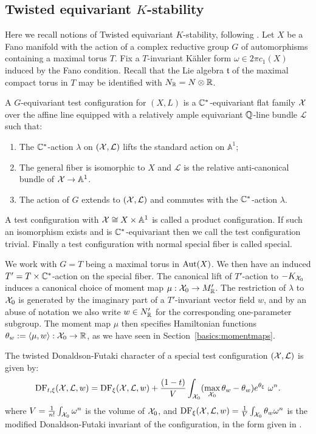 \subsection{Twisted equivariant $K$-stability}
\label{prelim:twisted}
Here we recall notions of Twisted equivariant $K$-stability, following \cite{datar2016kahler}. Let \(X\) be a Fano manifold with the action of a complex reductive group \(G\) of automorphisms containing a maximal torus \(T\). Fix a \(T\)-invariant K\"ahler form \(\omega \in 2 \pi c_1(X)\) induced by the Fano condition. Recall that the Lie algebra \(\mathfrak{t}\) of the maximal compact torus in \(T\) may be identified with \(N_{\mathbb{R}} = N \otimes \mathbb{R}\).
\begin{definition}
A \(G\)-equivariant test configuration for \((X,L)\) is a \(\mathbb{C}^*\)-equivariant flat family \({\mathcal{X}}\) over the affine line equipped with a relatively ample equivariant \(\mathbb{Q}\)-line bundle \(\mathcal{L}\) such that:
\begin{enumerate}
\item The \(\mathbb{C}^*\)-action \(\lambda\) on \(({\mathcal{X}}, \mathcal{L})\) lifts the standard action on \(\mathbb{A}^1\);
\item The general fiber is isomorphic to \(X\) and \(\mathcal{L}\) is the relative anti-canonical bundle of \({\mathcal{X}} \to \mathbb{A}^1\).
\item The action of \(G\) extends to \(({\mathcal{X}},\mathcal{L})\) and commutes with the \(\mathbb{C}^*\)-action \(\lambda\).
\end{enumerate}
A test configuration with \({\mathcal{X}} \cong X \times \mathbb{A}^1\) is called a product configuration. If such an isomorphism exists and is \(\mathbb{C}^*\)-equivariant then we call the test configuration trivial. Finally a test configuration with normal special fiber is called special.
\end{definition}
We work with \(G = T\) being a maximal torus in \(\mathop{\rm Aut}\nolimits(X)\). We then have an induced \(T' = T \times \mathbb{C}^*\)-action on the special fiber. The canonical lift of \(T'\)-action to \(-K_{{\mathcal{X}}_0}\) induces a canonical choice of moment map \(\mu: {\mathcal{X}}_0 \to M_{\mathbb{R}}'\). The restriction of \(\lambda\) to \({\mathcal{X}}_0\) is generated by the imaginary part of a \(T'\)-invariant vector field \(w\), and by an abuse of notation we also write \(w \in N'_{\mathbb{R}}\) for the corresponding  one-parameter subgroup. The moment map \(\mu\) then specifies Hamiltonian functions \(\theta_w := \langle \mu, w \rangle: {\mathcal{X}}_0 \to \mathbb{R}  \), as we have seen in Section~\ref{basics:momentmaps}.
\begin{definition}
The twisted Donaldson-Futaki character of a special test configuration \(({\mathcal{X}}, \mathcal{L}) \) is given by:
\[
\mathop{\rm DF}\nolimits_{t,\xi}({\mathcal{X}},\mathcal{L},w) = \mathop{\rm DF}\nolimits_{\xi}({\mathcal{X}},\mathcal{L},w) + \frac{(1-t)}{V} \int_{{\mathcal{X}}_0} ( \max_{{\mathcal{X}}_0} \theta_w - \theta_w)e^{\theta_\xi} \ \omega^n . 
\]
where \(V = \frac{1}{n!} \int_{{\mathcal{X}}_0} \omega^n\) is the volume of \({\mathcal{X}}_0\), and \(\mathop{\rm DF}\nolimits_\xi({\mathcal{X}},\mathcal{L},w) = \frac{1}{V} \int_{{\mathcal{X}}_0} \theta_w \omega^n\) is the modified Donaldson-Futaki invariant of the configuration, in the form given in \cite[Lemma 3.4]{berman2014complex}.
\end{definition}
